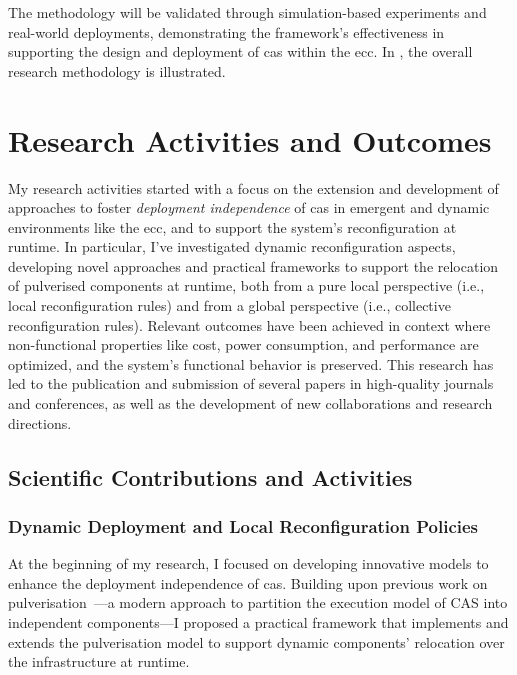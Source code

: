 \documentclass[runningheads]{llncs}
\begin{document}
The methodology will be validated through simulation-based experiments and real-world deployments,
demonstrating the framework's effectiveness in supporting the design and deployment of \ac{cas} within the \ac{ecc}.
%
In ,
the overall research methodology is illustrated.

\section{Research Activities and Outcomes}
\label{sec:research-activities}

My research activities started with a focus on the extension and development of approaches to foster \emph{deployment independence} of \ac{cas} in emergent and dynamic environments like the \ac{ecc},
and to support the system's reconfiguration at runtime.
%
In particular,
I've investigated dynamic reconfiguration aspects,
developing novel approaches and practical frameworks to support the relocation of pulverised components at runtime,
both from a pure local perspective (i.e., local reconfiguration rules) and from a global perspective (i.e., collective reconfiguration rules).
%
Relevant outcomes have been achieved in context where non-functional properties like cost,
power consumption,
and performance are optimized,
and the system's functional behavior is preserved.
%
This research has led to the publication and submission of several papers in high-quality journals and conferences,
as well as the development of new collaborations and research directions.

\subsection{Scientific Contributions and Activities}
\label{sec:scientific-contributions}

\subsubsection{Dynamic Deployment and Local Reconfiguration Policies}
At the beginning of my research,
I focused on developing innovative models to enhance the deployment independence of \ac{cas}.
%
Building upon previous work on pulverisation~\cite{DBLP:journals/fi/CasadeiPPVW20,DBLP:journals/iotj/CasadeiFPPSV22}---a modern approach to partition the execution model of CAS into independent components---I proposed a practical framework that implements and extends the pulverisation model to support dynamic components' relocation over the infrastructure at runtime.
\end{document}
